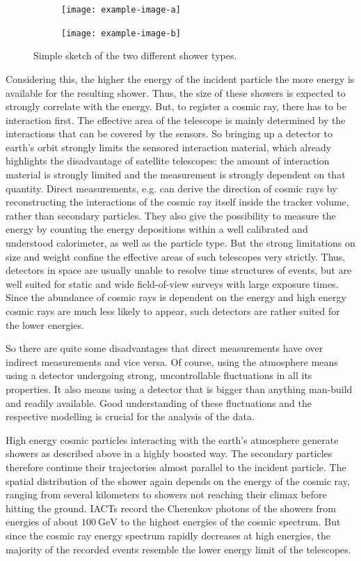 \begin{figure}
  \centering
  \begin{subfigure}{0.475\textwidth}
    \centering
    \texttt{[image: example-image-a]}
    \label{fig:proton}
  \end{subfigure}
  \begin{subfigure}{0.475\textwidth}
    \centering
    \texttt{[image: example-image-b]}
    \label{fig:gamma}
  \end{subfigure}
  \caption{Simple sketch of the two different shower types.}
  \label{fig:shower}
\end{figure}

Considering this, the higher the energy of the incident particle the more
energy is available for the resulting shower. Thus, the size of these showers
is expected to strongly correlate with the energy. But, to register a cosmic
ray, there has to be interaction first. The effective area of the telescope
is mainly determined by the interactions that can be covered by the sensors. So
bringing up a detector to earth's orbit strongly limits the sensored
interaction material, which already highlights the disadvantage of satellite
telescopes: the amount of interaction material is strongly limited and the
measurement is strongly dependent on that quantity. Direct measurements, e.g.
can derive the direction of cosmic rays by reconstructing the interactions of
the cosmic ray itself inside the tracker volume, rather than secondary
particles. They also give the possibility to measure the energy by counting the
energy depositions within a well calibrated and understood calorimeter, as well
as the particle type. But the strong limitations on size and weight confine the
effective areas of such telescopes very strictly. Thus, detectors in space are
usually unable to resolve time structures of events, but are well suited for
static and wide field-of-view surveys with large exposure times. Since the
abundance of cosmic rays is dependent on the energy and high energy cosmic rays
are much less likely to appear, such detectors are rather suited for the lower
energies.

So there are quite some disadvantages that direct measurements have over
indirect measurements and vice versa. Of course, using the atmosphere means
using a detector undergoing strong, uncontrollable fluctuations in all its
properties. It also means using a detector that is bigger than anything
man-build and readily available. Good understanding of these fluctuations and
the respective modelling is crucial for the analysis of the data.

High energy cosmic particles interacting with the earth's atmosphere generate
showers as described above in a highly boosted way. The secondary particles
therefore continue their trajectories almost parallel to the incident particle.
The spatial distribution of the shower again depends on the energy of the
cosmic ray, ranging from several kilometers to showers not reaching their
climax before hitting the ground. IACTs record the Cherenkov photons of the
showers from energies of about $\SI{100}{\giga\electronvolt}$ to the highest
energies of the cosmic spectrum. But since the cosmic ray energy spectrum
rapidly decreases at high energies, the majority of the recorded events
resemble the lower energy limit of the telescopes.
